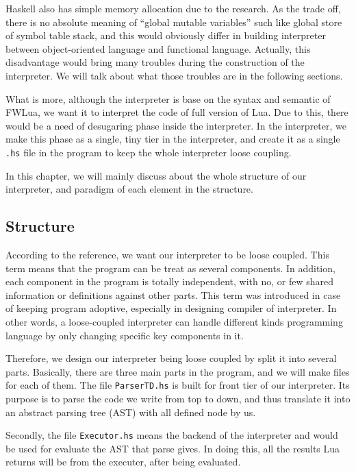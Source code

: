 \documentclass{article}
\begin{document}
Haskell also has simple memory allocation due to the research\cite{PIH}. As the trade off, there is no absolute meaning of ``global mutable variables'' such like global store of symbol table stack, and this would obviously differ in building interpreter between object-oriented language and functional language. Actually, this disadvantage would bring many troubles during the construction of the interpreter. We will talk about what those troubles are in the following sections.

What is more, although the interpreter is base on the syntax and semantic of FWLua, we want it to interpret the code of full version of Lua. Due to this, there would be a need of desugaring phase inside the interpreter. In the interpreter, we make this phase as a single, tiny tier in the interpreter, and create it as a single {\tt .hs} file in the program to keep the whole interpreter loose coupling.

In this chapter, we will mainly discuss about the whole structure of our interpreter, and paradigm of each element in the structure.

\subsection{Structure}
According to the reference\cite{WCAI}, we want our interpreter to be loose coupled\cite{looseC}. This term means that the program can be treat as several components. In addition, each component in the program is totally independent, with no, or few shared information or definitions against other parts. This term was introduced in case of keeping program adoptive, especially in designing compiler of interpreter. In other words, a loose-coupled interpreter can handle different kinds programming language by only changing specific key components in it.

Therefore, we design our interpreter being loose coupled by split it into several parts. Basically, there are three main parts in the program, and we will make files for each of them. The file {\tt ParserTD.hs} is built for front tier of our interpreter. Its purpose is to parse the code we write from top to down, and thus translate it into an abstract parsing tree (AST) with all defined node by us. 

Secondly, the file {\tt Executor.hs} means the backend of the interpreter and would be used for evaluate the AST that parse gives. In doing this, all the results Lua returns will be from the executer, after being evaluated. 
\end{document}
